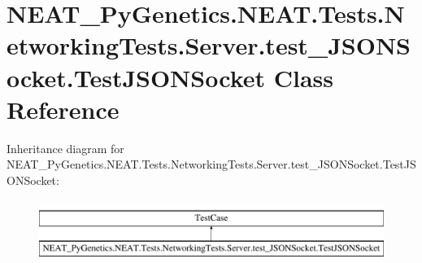 \hypertarget{class_n_e_a_t___py_genetics_1_1_n_e_a_t_1_1_tests_1_1_networking_tests_1_1_server_1_1test___j_s_717304c0cc9c54b2815a48a503f8f642}{}\section{N\+E\+A\+T\+\_\+\+Py\+Genetics.\+N\+E\+A\+T.\+Tests.\+Networking\+Tests.\+Server.\+test\+\_\+\+J\+S\+O\+N\+Socket.\+Test\+J\+S\+O\+N\+Socket Class Reference}
\label{class_n_e_a_t___py_genetics_1_1_n_e_a_t_1_1_tests_1_1_networking_tests_1_1_server_1_1test___j_s_717304c0cc9c54b2815a48a503f8f642}
Inheritance diagram for N\+E\+A\+T\+\_\+\+Py\+Genetics.\+N\+E\+A\+T.\+Tests.\+Networking\+Tests.\+Server.\+test\+\_\+\+J\+S\+O\+N\+Socket.\+Test\+J\+S\+O\+N\+Socket\+:\begin{figure}[H]
\begin{center}
\leavevmode
\includegraphics[height=2.000000cm]{class_n_e_a_t___py_genetics_1_1_n_e_a_t_1_1_tests_1_1_networking_tests_1_1_server_1_1test___j_s_717304c0cc9c54b2815a48a503f8f642}
\end{center}
\end{figure}
